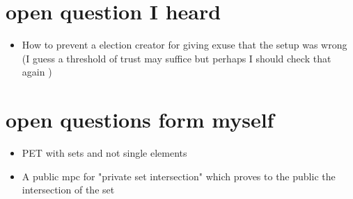 \documentclass[]{paper}
\begin{document}
\section{open question I heard}
\begin{itemize}
\item  How to prevent a election creator for giving exuse that the setup was wrong (I guess a threshold of trust may suffice but perhaps I should check that again )
\end{itemize}	
\section{open questions form myself}
\begin{itemize}
\item PET with sets and not single elements
\item A public mpc for "private set intersection" which proves to the public the intersection of the set

\end{itemize}	
\end{document}
